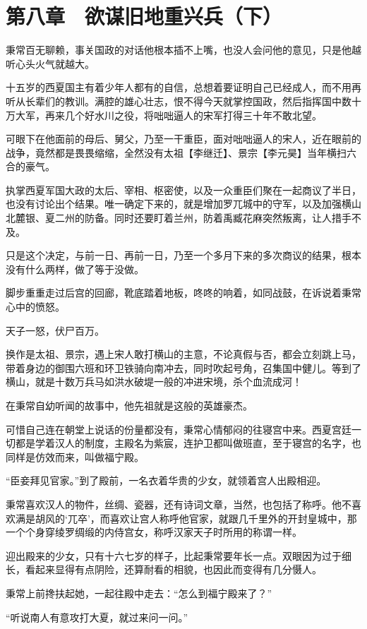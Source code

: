 \section{第八章　欲谋旧地重兴兵（下）}

秉常百无聊赖，事关国政的对话他根本插不上嘴，也没人会问他的意见，只是他越听心头火气就越大。

十五岁的西夏国主有着少年人都有的自信，总想着要证明自己已经成人，而不用再听从长辈们的教训。满腔的雄心壮志，恨不得今天就掌控国政，然后指挥国中数十万大军，再来几个好水川之役，将咄咄逼人的宋军打得三十年不敢北望。

可眼下在他面前的母后、舅父，乃至一干重臣，面对咄咄逼人的宋人，近在眼前的战争，竟然都是畏畏缩缩，全然没有太祖【李继迁】、景宗【李元昊】当年横扫六合的豪气。

执掌西夏军国大政的太后、宰相、枢密使，以及一众重臣们聚在一起商议了半日，也没有讨论出个结果。唯一确定下来的，就是增加罗兀城中的守军，以及加强横山北麓银、夏二州的防备。同时还要盯着兰州，防着禹臧花麻突然叛离，让人措手不及。

只是这个决定，与前一日、再前一日，乃至一个多月下来的多次商议的结果，根本没有什么两样，做了等于没做。

脚步重重走过后宫的回廊，靴底踏着地板，咚咚的响着，如同战鼓，在诉说着秉常心中的愤怒。

天子一怒，伏尸百万。

换作是太祖、景宗，遇上宋人敢打横山的主意，不论真假与否，都会立刻跳上马，带着身边的御围六班和环卫铁骑向南冲去，同时吹起号角，召集国中健儿。等到了横山，就是十数万兵马如洪水破堤一般的冲进宋境，杀个血流成河！

在秉常自幼听闻的故事中，他先祖就是这般的英雄豪杰。

可惜自己连在朝堂上说话的份量都没有，秉常心情郁闷的往寝宫中来。西夏宫廷一切都是学着汉人的制度，主殿名为紫宸，连护卫都叫做班直，至于寝宫的名字，也同样是仿效而来，叫做福宁殿。

“臣妾拜见官家。”到了殿前，一名衣着华贵的少女，就领着宫人出殿相迎。

秉常喜欢汉人的物件，丝绸、瓷器，还有诗词文章，当然，也包括了称呼。他不喜欢满是胡风的‘兀卒’，而喜欢让宫人称呼他官家，就跟几千里外的开封皇城中，那一个个身穿绫罗绸缎的内侍宫女，称呼汉家天子时所用的称谓一样。

迎出殿来的少女，只有十六七岁的样子，比起秉常要年长一点。双眼因为过于细长，看起来显得有点阴险，还算耐看的相貌，也因此而变得有几分慑人。

秉常上前搀扶起她，一起往殿中走去：“怎么到福宁殿来了？”

“听说南人有意攻打大夏，就过来问一问。”

